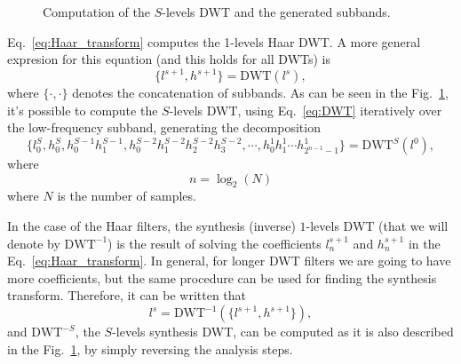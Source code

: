 \begin{figure}
  \centering
  \caption{Computation of the $S$-levels DWT and the generated
    subbands.}
  \label{fig:DWT}
\end{figure}

Eq.~\ref{eq:Haar_transform} computes the 1-levels Haar DWT. A more
general expresion for this equation (and this holds for all DWTs) is
\begin{equation}
  \{l^{s+1}, h^{s+1}\} = \text{DWT}(l^s),
  \label{eq:DWT}
\end{equation}
where $\{\cdot,\cdot\}$ denotes the concatenation of subbands. As can
be seen in the Fig.~\ref{fig:DWT}, it's possible to compute the
$S$-levels DWT, using Eq.~\ref{eq:DWT} iteratively over the
low-frequency subband, generating the decomposition
\begin{equation}
  \{l^S_0, h^S_0, h^{S-1}_0 h^{S-1}_1, h^{S-2}_0 h^{S-2}_1 h^{S-2}_2
  h^{S-2}_3, \cdots, h^1_0 h^1_1 \cdots
  h^1_{2^{n-1}-1}\}=\text{DWT}^S(l^0),
  \label{eq:S_levels_DWT}
\end{equation}
where
\begin{equation}
  n = \log_2(N)
\end{equation}
where $N$ is the number of samples.

In the case of the Haar filters, the synthesis (inverse) $1$-levels
DWT (that we will denote by $\text{DWT}^{-1}$) is the result of
solving the coefficients $l^{s+1}_n$ and $h^{s+1}_n$ in the
Eq.~\ref{eq:Haar_transform}. In general, for longer DWT filters we are
going to have more coefficients, but the same procedure can be used
for finding the synthesis transform. Therefore, it can be written that
\begin{equation}
  l^s = \text{DWT}^{-1}(\{l^{s+1}, h^{s+1}\}),
\end{equation}
and $\text{DWT}^{-S}$, the $S$-levels synthesis DWT, can be computed
as it is also described in the Fig.~\ref{fig:DWT}, by simply reversing
the analysis steps.

